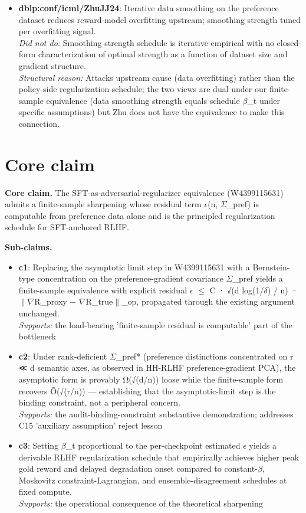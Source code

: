 \documentclass[10pt,a4paper]{article}
\begin{document}
\begin{tcolorbox}[colback=bgskill, colframe=cblue, title=\textbf{NoveltySkill — Idea Card (L3 Oral-Ready)}, breakable]
\begin{itemize}[leftmargin=*]
  \item \textbf{dblp:conf/icml/ZhuJJ24}: Iterative data smoothing on the preference dataset reduces reward-model overfitting upstream; smoothing strength tuned per overfitting signal. \\ \emph{Did not do:} Smoothing strength schedule is iterative-empirical with no closed-form characterization of optimal strength as a function of dataset size and gradient structure. \\ \emph{Structural reason:} Attacks upstream cause (data overfitting) rather than the policy-side regularization schedule; the two views are dual under our finite-sample equivalence (data smoothing strength equals schedule $\beta$\_t under specific assumptions) but Zhu does not have the equivalence to make this connection.
\end{itemize}

\section*{Core claim}
\textbf{Core claim.} The SFT-as-adversarial-regularizer equivalence (W4399115631) admits a finite-sample sharpening whose residual term $\epsilon$(n, $\Sigma$\_pref) is computable from preference data alone and is the principled regularization schedule for SFT-anchored RLHF.

\textbf{Sub-claims.}
\begin{itemize}[leftmargin=*]
  \item \textbf{c1}: Replacing the asymptotic limit step in W4399115631 with a Bernstein-type concentration on the preference-gradient covariance $\Sigma$\_pref yields a finite-sample equivalence with explicit residual $\epsilon$ $\le$ C · √(d log(1/$\delta$) / n) · $\|$$\nabla$R\_proxy − $\nabla$R\_true$\|$\_op, propagated through the existing argument unchanged. \\ \emph{Supports:} the load-bearing 'finite-sample residual is computable' part of the bottleneck
  \item \textbf{c2}: Under rank-deficient $\Sigma$\_pref* (preference distinctions concentrated on r ≪ d semantic axes, as observed in HH-RLHF preference-gradient PCA), the asymptotic form is provably Ω(√(d/n)) loose while the finite-sample form recovers Õ(√(r/n)) --- establishing that the asymptotic-limit step is the binding constraint, not a peripheral concern. \\ \emph{Supports:} the audit-binding-constraint substantive demonstration; addresses C15 'auxiliary assumption' reject lesson
  \item \textbf{c3}: Setting $\beta$\_t proportional to the per-checkpoint estimated $\epsilon$ yields a derivable RLHF regularization schedule that empirically achieves higher peak gold reward and delayed degradation onset compared to constant-$\beta$, Moskovitz constraint-Lagrangian, and ensemble-disagreement schedules at fixed compute. \\ \emph{Supports:} the operational consequence of the theoretical sharpening
\end{itemize}


\end{tcolorbox}
\end{document}

